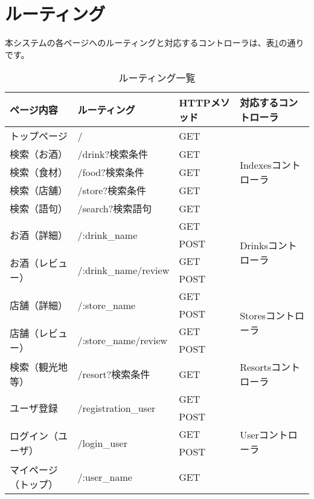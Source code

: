 \documentclass[a4j,titlepage]{jarticle}
\begin{document}
\newpage
\section{ルーティング}
本システムの各ページへのルーティングと対応するコントローラは、表\ref{routing}の通りです。

\begin{table}[!htbp]
\caption{ルーティング一覧}
\label{routing}
\small
\begin{center}
\begin{tabular}{|l|l|l|p{4cm}|}\hline
ページ内容 & ルーティング & HTTPメソッド & 対応するコントローラ\\\hline\hline
トップページ & / & GET & \multirow{5}{*}{Indexesコントローラ} \\\cline{1-3}
検索（お酒） & /drink?検索条件 & GET & \\\cline{1-3}
検索（食材） & /food?検索条件 & GET & \\\cline{1-3}
検索（店舗） & /store?検索条件 & GET &  \\\cline{1-3}
検索（語句） & /search?検索語句 & GET & \\\hline
\multirow{2}{*}{お酒（詳細）} & \multirow{2}{*}{/:drink\_name}
& GET & \multirow{4}{*}{Drinksコントローラ} \\\cline{3-3}
 & & POST &  \\\cline{1-3}
\multirow{2}{*}{お酒（レビュー）} & \multirow{2}{*}{/:drink\_name/review}
& GET & \\\cline{3-3}
 & & POST & \\\hline
\multirow{2}{*}{店舗（詳細）} & \multirow{2}{*}{/:store\_name}
& GET & \multirow{4}{*}{Storesコントローラ} \\\cline{3-3}
 & & POST &  \\\cline{1-3}
\multirow{2}{*}{店舗（レビュー）}& \multirow{2}{*}{/:store\_name/review}
& GET &  \\\cline{3-3}
 & & POST &\\\hline
検索（観光地等） & /resort?検索条件 & GET & Resortsコントローラ \\\hline
\multirow{2}{*}{ユーザ登録} & \multirow{2}{*}{/registration\_user}
& GET & \multirow{12}{*}{Userコントローラ} \\\cline{3-3}
 & & POST & \\\cline{1-3}
 \multirow{2}{*}{ログイン（ユーザ）} & \multirow{2}{*}{/login\_user}
 & GET & \\\cline{3-3}
 & & POST & \\\cline{1-3}
マイページ（トップ） & /:user\_name
& GET & \\\cline{1-3}

\end{tabular}
\end{center}
\end{table}
\end{document}
